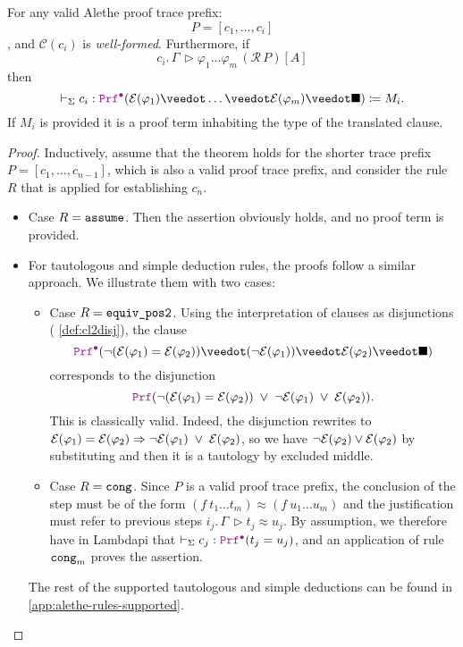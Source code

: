 \begin{theorem}\label{theorem:soundness}
  For any valid Alethe proof trace prefix:
  \[
    P = [c_1, \dots, c_i]
  \]
  , and $\mathcal{C}(c_i)$ is \emph{well-formed}. Furthermore, if
  \[
    c_i.\,\Gamma\, \triangleright \varphi_1 \dots \varphi_m \, (\mathcal{R}\,P)[A]
  \]
  then
  \[
    \vdash_\Sigma c_i : \pid (\E{\varphi_1} \veedot \dots  \veedot \E{\varphi_m} \veedot \nil) \coloneq M_i.
  \] If $M_i$ is provided it is a proof term inhabiting the type of the translated clause.
\end{theorem}
\begin{proof}
  Inductively, assume that the theorem holds for the shorter trace prefix $P = [c_1, \dots, c_{n-1}]$, which is also a valid proof trace prefix, and consider the rule $R$ that is applied for establishing $c_n$.
  \begin{itemize}
  \item Case $R = \texttt{\upshape{assume}}$. Then the assertion obviously holds, and no proof term is provided.
  \item For tautologous and simple deduction rules, the proofs follow a similar approach. We illustrate them with two cases:
  \begin{itemize}
  \item Case $R = \texttt{\upshape{equiv\_pos2}}$.
    Using the interpretation of clauses as disjunctions ( \cref{def:cl2disj}), the clause
    \[
       \prfcl (\neg(\E{\varphi_1} = \E{\varphi_2}) \veedot (\neg \E{\varphi_1}) \veedot \E{\varphi_2} \veedot \nil)
    \]
    corresponds to the disjunction
    \[
      \prf (\neg(\E{\varphi_1} = \E{\varphi_2}) \;\lor\; \neg \E{\varphi_1} \;\lor\; \E{\varphi_2}).
    \]
    This is classically valid.
    Indeed, the disjunction rewrites to  $\mathcal{E}(\varphi_1) = \mathcal{E}(\varphi_2) \Rightarrow \neg \mathcal{E}(\varphi_1) \;\lor\; \mathcal{E}(\varphi_2)$, so we have $\neg \mathcal{E}(\varphi_2) \lor \mathcal{E}(\varphi_2)$ by substituting and then it is a tautology by excluded middle.
  \item Case $R = \texttt{\upshape{cong}}$. Since $P$ is a valid proof trace prefix, the conclusion of the step must be of the form $(f~t_1 \ldots t_m) \approx (f~u_1 \ldots u_m)$ and the justification must refer to previous steps $i_j.\,\Gamma\,\triangleright t_j \approx u_j$.
  By assumption, we therefore have in Lambdapi that $\vdash_{\Sigma} c_j: \pid (t_j = u_j)$, and an application of rule $\texttt{\upshape{cong}}_m$ proves the assertion.
  \end{itemize}
  The rest of the supported tautologous and simple deductions can be found in \cref{app:alethe-rules-supported}.

\end{itemize}
\end{proof}
